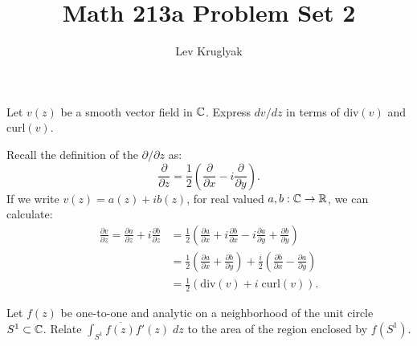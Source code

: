 \documentclass{pset}
\title{Math 213a Problem Set 2}
\author{Lev Kruglyak}
\begin{document}
\maketitle


\begin{problem}{2}
    Let $v(z)$ be a smooth vector field in $\mathbb{C}$. Express $dv /dz$ in terms of $\textrm{div}(v)$ and $\textrm{curl}(v)$.
\end{problem}

\begin{solution}
    Recall the definition of the $\partial / \partial z$ as:
    \[
        \frac{\partial}{\partial z} = \frac{1}{2}\left(\frac{\partial}{\partial x}-i\frac{\partial}{\partial y}\right)
    .\] 
    If we write $v(z)=a(z)+ib(z)$, for real valued $a,b : \mathbb{C} \to \mathbb{R}$, we can calculate:
    \[
        \begin{aligned}
            \frac{\partial v}{\partial z} = \frac{\partial a}{\partial z} + i\frac{\partial b}{\partial z} &= \frac{1}{2}\left(\frac{\partial a}{\partial x} + i \frac{\partial b}{\partial x} - i \frac{\partial a}{\partial y} + \frac{\partial b}{\partial y}\right)\\
            &= \frac{1}{2}\left(\frac{\partial a}{\partial x}+\frac{\partial b}{\partial y}\right) + \frac{i}{2}\left(\frac{\partial b}{\partial x} - \frac{\partial a}{\partial y}\right)\\
            &= \frac{1}{2}\left(\textrm{div}(v)+i\;\textrm{curl}(v)\right).
        \end{aligned}
    \] 
\end{solution}

\begin{problem}{3}
    Let $f(z)$ be one-to-one and analytic on a neighborhood of the unit circle $S^1\subset \mathbb{C}$. Relate $\int_{S^1}\overline{f(z)}f'(z)\;dz$ to the area of the region enclosed by $f(S^1)$.
\end{problem}
\end{document}
